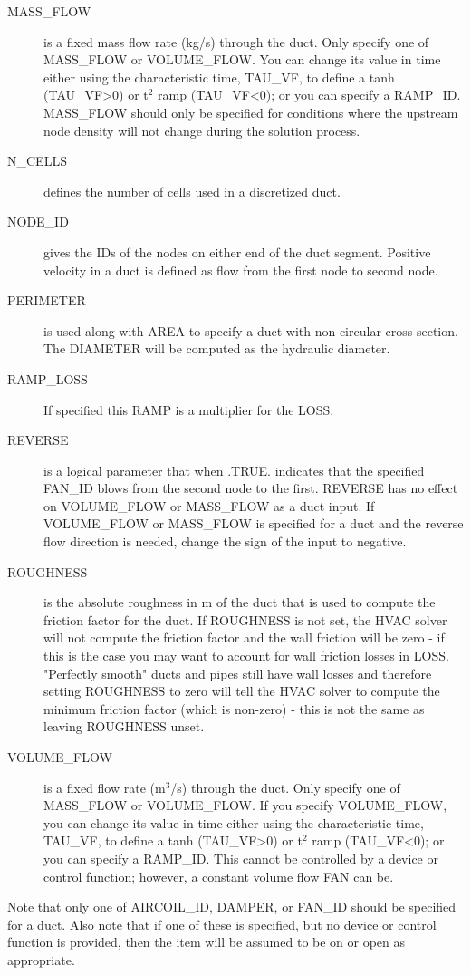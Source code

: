 \documentclass[11pt]{book}
\begin{document}
\begin{description}
\item[{\ct MASS\_FLOW}] is a fixed mass flow rate (kg/s) through the duct.  Only specify one of {\ct MASS\_FLOW} or {\ct VOLUME\_FLOW}.  You can change its value in time either using the characteristic time, {\ct TAU\_VF},  to define a tanh ({\ct TAU\_VF}>0) or t$^2$ ramp ({\ct TAU\_VF}<0); or you can specify a {\ct RAMP\_ID}.  {\ct MASS\_FLOW} should only be specified for conditions where the upstream node density will not change during the solution process.
\item[{\ct N\_CELLS}] defines the number of cells used in a discretized duct.
\item[{\ct NODE\_ID}] gives the {\ct ID}s of the nodes on either end of the duct segment.  Positive velocity in a duct is defined as flow from the first node to second node.
\item[{\ct PERIMETER}] is used along with {\ct AREA} to specify a duct with non-circular cross-section.  The {\ct DIAMETER} will be computed as the hydraulic diameter.
\item[{\ct RAMP\_LOSS}] If specified this {\ct RAMP} is a multiplier for the {\ct LOSS}.
\item[{\ct REVERSE}]  is a logical parameter that when {\ct .TRUE.} indicates that the specified {\ct FAN\_ID} blows from the second node to the first. {\ct REVERSE} has no effect on {\ct VOLUME\_FLOW} or {\ct MASS\_FLOW} as a duct input. If {\ct VOLUME\_FLOW} or {\ct MASS\_FLOW} is specified for a duct and the reverse flow direction is needed, change the sign of the input to negative.
\item[{\ct ROUGHNESS}] is the absolute roughness in m of the duct that is used to compute the friction factor for the duct. If {\ct ROUGHNESS} is not set, the HVAC solver will not compute the friction factor and the wall friction will be zero - if this is the case you may want to account for wall friction losses in {\ct LOSS}. "Perfectly smooth" ducts and pipes still have wall losses and therefore setting {\ct ROUGHNESS} to zero will tell the HVAC solver to compute the minimum friction factor (which is non-zero) - this is not the same as leaving {\ct ROUGHNESS} unset.
\item[{\ct VOLUME\_FLOW}] is a fixed flow rate (m$^3$/s) through the duct.  Only specify one of {\ct MASS\_FLOW} or {\ct VOLUME\_FLOW}. If you specify {\ct VOLUME\_FLOW}, you can change its value in time either using the characteristic time, {\ct TAU\_VF},  to define a tanh ({\ct TAU\_VF}>0) or t$^2$ ramp ({\ct TAU\_VF}<0); or you can specify a {\ct RAMP\_ID}.  This cannot be controlled by a device or control function; however, a constant volume flow {\ct FAN} can be.
\end{description}
Note that only one of {\ct AIRCOIL\_ID}, {\ct DAMPER}, or {\ct FAN\_ID} should be specified for a duct.  Also note that if one of these is specified, but no device or control function is provided, then the item will be assumed to be on or open as appropriate.
\end{document}

